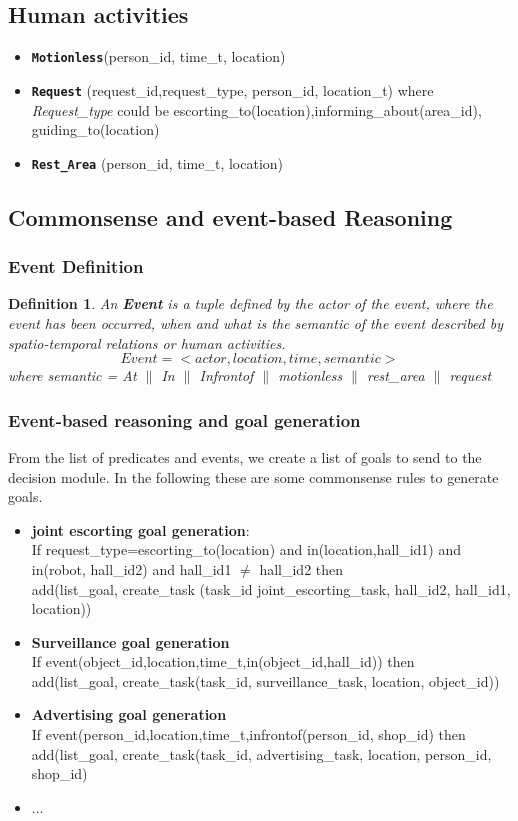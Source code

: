 \documentclass{article}
\newtheorem{defn}{Definition}
\begin{document}
\subsection{Human activities}
\begin{itemize}
\item {\tt\bf Motionless}(person\_id, time\_t, location)
\item {\tt\bf Request} (request\_id,request\_type, person\_id, location\_t) where {\it Request\_type}  could be escorting\_to(location),informing\_about(area\_id), guiding\_to(location)
\item {\tt\bf Rest\_Area} (person\_id, time\_t, location)
 \end{itemize}
  \subsection{Commonsense and event-based Reasoning}
  \subsubsection{Event Definition}
  \begin{defn}
  An {\bf Event} is a tuple defined by the actor of the event, where the event has been occurred, when and what is the semantic of the event described by spatio-temporal relations or human activities. 
  \[ Event = <actor, location, time, semantic> \] 
  where semantic = At $\|$ In $\|$ Infrontof $\|$ motionless $\|$ rest\_area $\|$ request \\
  \end{defn}
   \subsubsection{Event-based reasoning and goal generation}
   From the list of predicates and events, we create a list of goals to send to the decision module. In the following these are some commonsense rules to generate goals. 
   \begin{itemize}
\item  {\bf joint escorting goal generation}: \\
  If request\_type=escorting\_to(location) and in(location,hall\_id1) and in(robot, hall\_id2) and hall\_id1 $\neq$ hall\_id2 then \\
  add(list\_goal, create\_task (task\_id joint\_escorting\_task, hall\_id2, hall\_id1, location))
\item  {\bf Surveillance goal generation} \\
  If event(object\_id,location,time\_t,in(object\_id,hall\_id)) then \\
  add(list\_goal, create\_task(task\_id, surveillance\_task, location, object\_id))
\item {\bf Advertising goal generation} \\
   If event(person\_id,location,time\_t,infrontof(person\_id, shop\_id) then \\
   add(list\_goal, create\_task(task\_id, advertising\_task, location, person\_id, shop\_id)
\item $\dots$
   \end{itemize}
   
\end{document}

